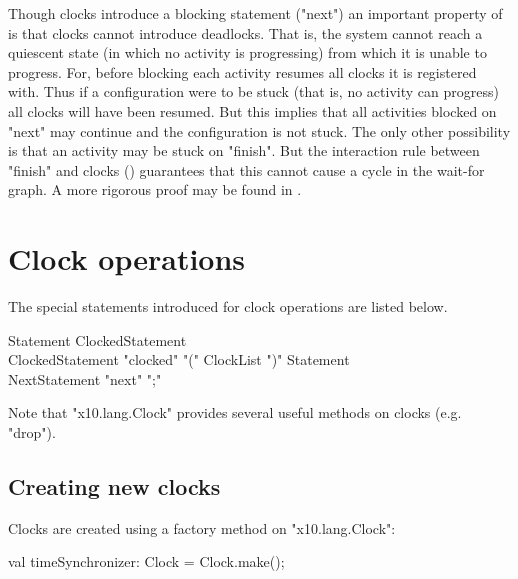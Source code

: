 
Though clocks introduce a blocking statement (\xcd"next") an important
property of \Xten{} is that clocks cannot introduce deadlocks. That
is, the system cannot reach a quiescent state (in which no activity is
progressing) from which it is unable to progress. For, before blocking
each activity resumes all clocks it is registered with. Thus if a
configuration were to be stuck (that is, no activity can progress) all
clocks will have been resumed. But this implies that all activities
blocked on \xcd"next" may continue and the configuration is not stuck.
The only other possibility is that an activity may be stuck on
\xcd"finish". But the interaction rule between \xcd"finish" and clocks
() guarantees that this cannot cause a cycle
in the wait-for graph. A more rigorous proof may be found in \cite{X10-concur05}.

\section{Clock operations}\label{sec:clock}
The special statements introduced for clock operations are listed below.

\begin{grammar}
Statement \: ClockedStatement \\
ClockedStatement \: \xcd"clocked" \xcd"(" ClockList \xcd")" Statement \\
NextStatement \: \xcd"next" \xcd";" \\
\end{grammar}

Note that \xcd"x10.lang.Clock" provides several useful methods on
clocks (e.g. \xcd"drop").

\subsection{Creating new clocks}\label{sec:clock:create}

Clocks are created using a factory method on \xcd"x10.lang.Clock":


\begin{xten}
val timeSynchronizer: Clock = Clock.make();
\end{xten}

